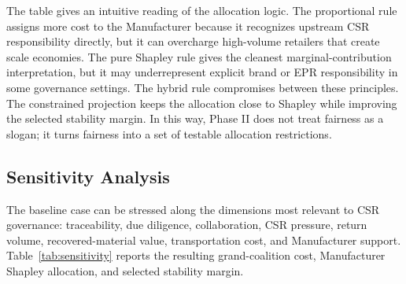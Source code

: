 \begin{table}[htbp]
\centering
\caption{Allocation-Rule Comparison}
\label{tab:allocation_rules}
\end{table}

The table gives an intuitive reading of the allocation logic. The proportional rule assigns more cost to the Manufacturer because it recognizes upstream CSR responsibility directly, but it can overcharge high-volume retailers that create scale economies. The pure Shapley rule gives the cleanest marginal-contribution interpretation, but it may underrepresent explicit brand or EPR responsibility in some governance settings. The hybrid rule compromises between these principles. The constrained projection keeps the allocation close to Shapley while improving the selected stability margin. In this way, Phase II does not treat fairness as a slogan; it turns fairness into a set of testable allocation restrictions.

\subsection{Sensitivity Analysis}

The baseline case can be stressed along the dimensions most relevant to CSR governance: traceability, due diligence, collaboration, CSR pressure, return volume, recovered-material value, transportation cost, and Manufacturer support. Table~\ref{tab:sensitivity} reports the resulting grand-coalition cost, Manufacturer Shapley allocation, and selected stability margin.

